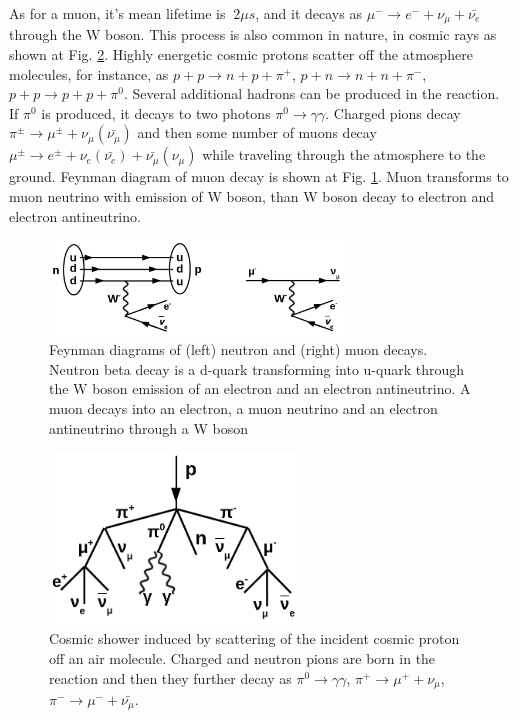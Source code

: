 As for a muon, it's mean lifetime is $~2 {\mu}s$, and it decays as ${\mu}^- \rightarrow e^- + {\nu}_{\mu} + \bar{{\nu}_e}$ through the W boson. This process is also common in nature, in cosmic rays as shown at Fig. \ref{fig:cosmicMuons}. Highly energetic cosmic protons scatter off the atmosphere molecules, for instance, as $p+p \rightarrow n+p+\pi^+$, $p+n \rightarrow n+n+\pi^-$, $p+p \rightarrow p+p+\pi^0$. Several additional hadrons can be produced in the reaction. If $\pi^0$ is produced, it decays to two photons $\pi^0 \rightarrow \gamma\gamma$. Charged pions decay $\pi^{\pm} \rightarrow \mu^{\pm} + \nu_\mu(\bar{\nu_\mu})$ and then some number of muons decay $\mu^{\pm} \rightarrow e^{\pm} + \nu_e(\bar{\nu_e}) + \bar{\nu_\mu}(\nu_\mu)$ while traveling through the atmosphere to the ground. Feynman diagram of muon decay is shown at Fig. \ref{fig:MuonAndNeutronDecays}. Muon transforms to muon neutrino with emission of W boson, than W boson decay to electron and electron antineutrino.\\

\begin{figure}
\caption{Feynman diagrams of (left) neutron and (right) muon decays. Neutron beta decay is a d-quark transforming into u-quark through the W boson emission of an electron and an electron antineutrino. A muon decays into an electron, a muon neutrino and an electron antineutrino through a W boson}
\label{fig:MuonAndNeutronDecays}
\centering
\includegraphics[width=0.70\textwidth, keepaspectratio=true]{figs/NeutronAndMuonDecays.png}
\end{figure}

\begin{figure}
\caption{Cosmic shower induced by scattering of the incident cosmic proton off an air molecule. Charged and neutron pions are born in the reaction and then they further decay as $\pi^0 \rightarrow \gamma\gamma$, $\pi^+ \rightarrow \mu^+ + \nu_\mu$, $\pi^- \rightarrow \mu^- + \bar{\nu_\mu}$.}
\label{fig:cosmicMuons}
\centering
\includegraphics[width=0.60\textwidth, keepaspectratio=true]{figs/cosmicMuons.png}
\end{figure}




